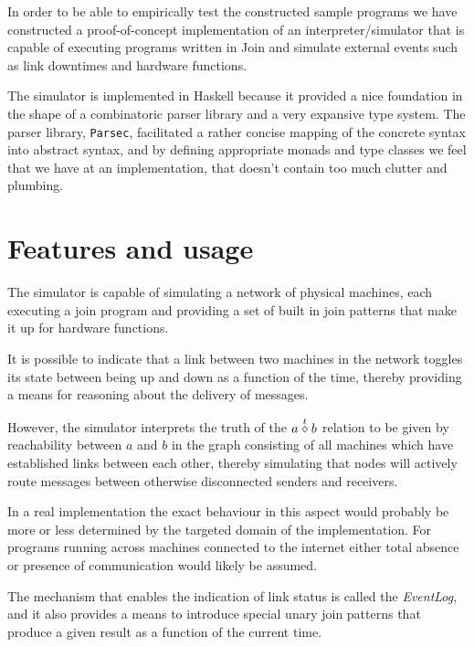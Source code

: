 

In order to be able to empirically test the constructed sample programs we have
constructed a proof-of-concept implementation of an interpreter/simulator that
is capable of executing programs written in Join and simulate external events
such as link downtimes and hardware functions.

The simulator is implemented in Haskell because it provided a nice foundation in
the shape of a combinatoric parser library and a very expansive type system. The
parser library, \texttt{Parsec}, facilitated a rather concise mapping of the
concrete syntax into abstract syntax, and by defining appropriate monads and
type classes we feel that we have at an implementation, that doesn't contain too
much clutter and plumbing.

\section{Features and usage}
The simulator is capable of simulating a network of physical machines, each
executing a join program and providing a set of built in join patterns that make
it up for hardware functions.

It is possible to indicate that a link between two machines in the network
toggles its state between being up and down as a function of the time, thereby providing a means for reasoning about the delivery of messages.

However, the simulator interprets the truth of the $a \stackrel{t}{\diamond} b$ relation to be
given by reachability between $a$ and $b$ in the graph consisting of all
machines which have established links between each other, thereby simulating
that nodes will actively route messages between otherwise disconnected senders
and receivers.

In a real implementation the exact behaviour in this aspect would probably be
more or less determined by the targeted domain of the implementation. For
programs running across machines connected to the internet either total absence
or presence of communication would likely be assumed.

The mechanism that enables the indication of link status is called the
\emph{EventLog}, and it also provides a means to introduce special unary join
patterns that produce a given result as a function of the current time.


